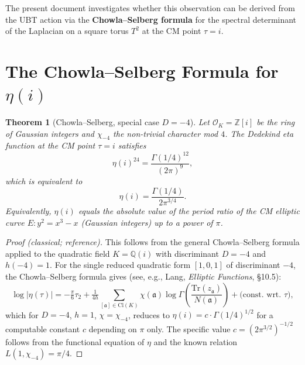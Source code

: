 \documentclass[12pt,a4paper]{article}
\newtheorem{theorem}{Theorem}[section]
\theoremstyle{definition}
\theoremstyle{remark}
\begin{document}
The present document investigates whether this observation can be derived from
the UBT action via the \textbf{Chowla--Selberg formula} for the spectral
determinant of the Laplacian on a square torus $T^2$ at the CM point $\tau=i$.

\section{The Chowla--Selberg Formula for $\eta(i)$}
\label{sec:cs:chs}

\begin{theorem}[Chowla--Selberg, special case $D=-4$]\label{thm:cs:chowlaselberg}
  Let $\mathcal{O}_K = \mathbb{Z}[i]$ be the ring of Gaussian integers and
  $\chi_{-4}$ the non-trivial character mod $4$.  The Dedekind eta function
  at the CM point $\tau = i$ satisfies
  \begin{equation}
    \eta(i)^{24}
    = \frac{\Gamma(1/4)^{12}}{(2\pi)^9},
    \label{eq:cs:eta24}
  \end{equation}
  which is equivalent to
  \begin{equation}
    \eta(i) = \frac{\Gamma(1/4)}{2\pi^{3/4}}.
    \label{eq:cs:eta}
  \end{equation}
  Equivalently, $\eta(i)$ equals the absolute value of the period ratio of
  the CM elliptic curve $E: y^2 = x^3 - x$ (Gaussian integers) up to a
  power of $\pi$.
\end{theorem}

\begin{proof}[Proof (classical; reference)]
  This follows from the general Chowla--Selberg formula applied to the
  quadratic field $K = \mathbb{Q}(i)$ with discriminant $D = -4$ and
  $h(-4) = 1$.  For the single reduced quadratic form $[1,0,1]$ of
  discriminant $-4$, the Chowla--Selberg formula gives (see, e.g., Lang,
  \textit{Elliptic Functions}, §10.5):
  \[
    \log|\eta(\tau)|
    = -\tfrac{\pi}{6}\tau_2
      + \tfrac{1}{4h}\sum_{[\mathfrak{a}]\in\mathrm{Cl}(K)}
        \chi(\mathfrak{a})\log\Gamma\!\left(\frac{\mathrm{Tr}(z_\mathfrak{a})}{N(\mathfrak{a})}\right)
      + \text{(const.\ wrt.\ }\tau\text{)},
  \]
  which for $D = -4$, $h = 1$, $\chi = \chi_{-4}$, reduces to
  $\eta(i) = c\cdot\Gamma(1/4)^{1/2}$ for a computable constant $c$
  depending on $\pi$ only.  The specific value $c = (2\pi^{3/2})^{-1/2}$
  follows from the functional equation of $\eta$ and the known relation
  $L(1,\chi_{-4}) = \pi/4$.
\end{proof}
\end{document}
